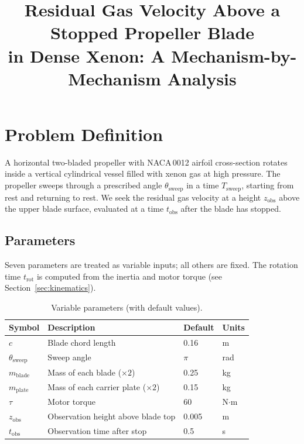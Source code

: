 \documentclass[11pt,a4paper]{article}
\title{Residual Gas Velocity Above a Stopped Propeller Blade\\
       in Dense Xenon: A Mechanism-by-Mechanism Analysis}
\author{}
\date{}
\begin{document}
\maketitle

\section{Problem Definition}
\label{sec:problem}

A horizontal two-bladed propeller with NACA\,0012 airfoil cross-section
rotates inside a vertical cylindrical vessel filled with xenon gas at
high pressure. The propeller sweeps through a prescribed angle
$\theta_\mathrm{sweep}$ in a time $T_\mathrm{sweep}$, starting from
rest and returning to rest. We seek the residual gas velocity at a
height $z_\mathrm{obs}$ above the upper blade surface, evaluated at a
time $t_\mathrm{obs}$ after the blade has stopped.

\subsection{Parameters}

Seven parameters are treated as variable inputs; all others are fixed.
The rotation time $t_\mathrm{rot}$ is computed from the inertia and
motor torque (see Section~\ref{sec:kinematics}).

\begin{table}[H]
\centering
\caption{Variable parameters (with default values).}
\label{tab:params}
\begin{tabular}{llll}
\toprule
Symbol & Description & Default & Units \\
\midrule
$c$                   & Blade chord length          & 0.16  & m   \\
$\theta_\mathrm{sweep}$ & Sweep angle              & $\pi$ & rad \\
$m_\mathrm{blade}$   & Mass of each blade ($\times 2$)  & 0.25  & kg  \\
$m_\mathrm{plate}$   & Mass of each carrier plate ($\times 2$) & 0.15 & kg \\
$\tau$               & Motor torque                & 60    & N$\cdot$m \\
$z_\mathrm{obs}$     & Observation height above blade top & 0.005 & m \\
$t_\mathrm{obs}$     & Observation time after stop  & 0.5   & s   \\
\bottomrule
\end{tabular}
\end{table}
\end{document}
